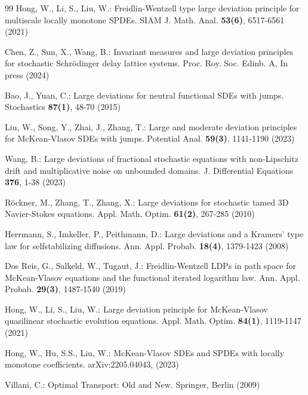 \documentclass[11pt]{article}
\numberwithin{equation}{section}
\theoremstyle{plain}
\begin{document}
\begin{thebibliography}{99}
  Hong, W.,  Li, S.,  Liu, W.:
  Freidlin-Wentzell type large deviation principle for multiscale locally monotone SPDEs.
  SIAM J. Math. Anal. {\bf 53(6)}, 6517-6561 (2021)

  Chen, Z.,  Sun, X.,  Wang, B.:
  Invariant measures and large deviation principles for stochastic Schr\"{o}dinger delay lattice systems.
  Proc. Roy. Soc. Edinb. A, In press (2024)



  Bao, J.,  Yuan, C.:
  Large deviations for neutral functional SDEs with jumps.
  Stochastics {\bf 87(1)}, 48-70 (2015)

  Liu, W.,  Song, Y.,  Zhai, J.,  Zhang, T.:
  Large and moderate deviation principles for McKean-Vlasov SDEs with jumps.
  Potential Anal. {\bf 59(3)}, 1141-1190 (2023)


  Wang, B.:
  Large deviations of fractional stochastic equations with non-Lipschitz drift and multiplicative noise on unbounded domains.
  J. Differential Equations {\bf 376}, 1-38 (2023)

  R\"{o}ckner, M.,  Zhang, T.,  Zhang, X.:
  Large deviations for stochastic tamed 3D Navier-Stokes equations.
  Appl. Math. Optim. {\bf 61(2)}, 267-285 (2010)



  Herrmann, S.,  Imkeller, P.,  Peithmann, D.:
  Large deviations and a Kramers' type law for selfstabilizing diffusions.
  Ann. Appl. Probab. {\bf 18(4)}, 1379-1423 (2008)

  Dos Reis, G.,  Salkeld, W.,  Tugaut, J.:
  Freidlin-Wentzell LDPs in path space for McKean-Vlasov equations and the functional iterated logarithm law.
  Ann. Appl. Probab. {\bf 29(3)}, 1487-1540 (2019)

  Hong, W.,  Li, S.,  Liu, W.:
  Large deviation principle for McKean-Vlasov quasilinear stochastic evolution equations.
  Appl. Math. Optim. {\bf 84(1)},  1119-1147 (2021)

  Hong, W.,  Hu, S.S.,  Liu, W.:
  McKean-Vlasov SDEs and SPDEs with locally monotone coefficients.
  arXiv:2205.04043, (2023)

  Villani, C.:
  Optimal Transport: Old and New.
  Springer, Berlin (2009)


\end{thebibliography}
\end{document}

